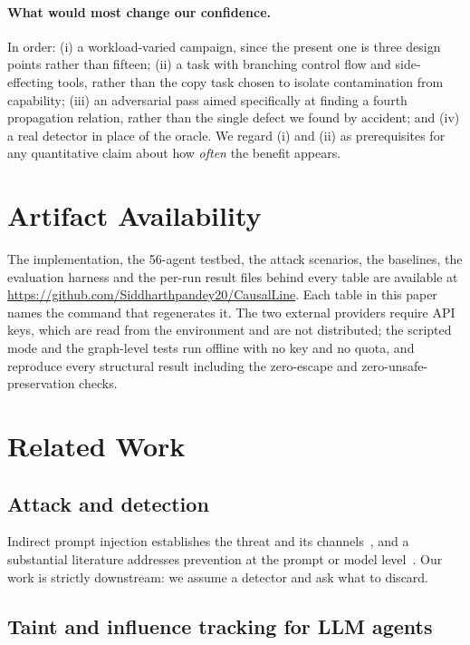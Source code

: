 \documentclass[10pt,twocolumn]{article}
\begin{document}
\paragraph{What would most change our confidence.}
In order: (i) a workload-varied campaign, since the present one is three
design points rather than fifteen; (ii) a task with branching control flow and
side-effecting tools, rather than the copy task chosen to isolate
contamination from capability; (iii) an adversarial pass aimed specifically at
finding a fourth propagation relation, rather than the single defect we found
by accident; and (iv) a real detector in place of the oracle. We regard (i)
and (ii) as prerequisites for any quantitative claim about how \emph{often}
the benefit appears.

\section*{Artifact Availability}

The implementation, the 56-agent testbed, the attack scenarios, the baselines,
the evaluation harness and the per-run result files behind every table are
available at \url{https://github.com/Siddharthpandey20/CausalLine}. Each table
in this paper names the command that regenerates it. The two external
providers require API keys, which are read from the environment and are not
distributed; the scripted mode and the graph-level tests run offline with no
key and no quota, and reproduce every structural result including the
zero-escape and zero-unsafe-preservation checks.

\section{Related Work}
\label{sec:related}

\subsection{Attack and detection}

Indirect prompt injection establishes the threat and its
channels~\cite{greshake2023,perez2022,liu2024}, and a substantial literature
addresses prevention at the prompt or model level~\cite{chen2024}. Our work is
strictly downstream: we assume a detector and ask what to discard.

\subsection{Taint and influence tracking for LLM agents}
\end{document}
